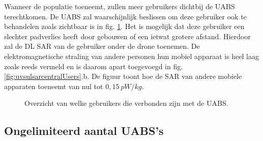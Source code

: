 \documentclass[twocolumn]{phdsymp_dutch}
\begin{document}
Wanneer de populatie toeneemt, zullen meer gebruikers dichtbij de \gls{UABS} terechtkomen.
De \gls{UABS} zal waarschijnlijk beslissen om deze gebruiker ook te behandelen zoals zichtbaar is in fig. \ref{fig:connectionMap}.
Het is mogelijk dat deze gebruiker een slechter padverlies heeft door gebouwen of een ietwat grotere afstand. Hierdoor zal de
\gls{DL} \gls{SAR} van de gebruiker onder de drone toenemen.
De elektromagnetische straling van andere personen hun mobiel apparaat is heel laag zoals 
reeds vermeld en is daarom apart toegevoegd in fig.  \ref{fig:uvsulsarcentralUsers}.b.
De figuur toont hoe de \gls{SAR} van andere mobiele apparaten toeneemt van nul tot $0,15\ pW/kg$.
\begin{figure}[h]
\hfill
{}
\caption{ Overzicht van welke gebruikers die verbonden zijn met de \acs{UABS}.}
  \label{fig:connectionMap}
\end{figure}

\subsection{Ongelimiteerd aantal \gls{UABS}'s}
\end{document}
